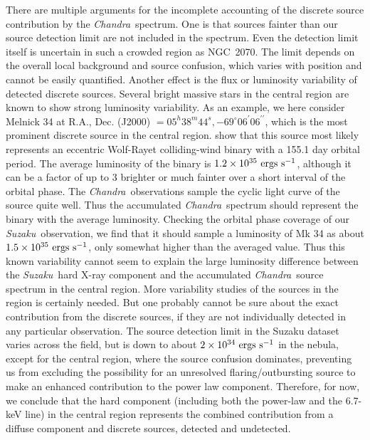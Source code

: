 \documentclass[usenatbib]{mnras}
\def\suzaku{{\sl Suzaku}}
\def\chandra{{\sl Chandra}}
\begin{document}
There are multiple arguments for the incomplete accounting of the discrete source contribution by the \chandra\ spectrum. One is that sources fainter than our source detection limit are not included in the spectrum. Even the detection limit itself is uncertain in such a crowded region as NGC~2070. The limit depends on the overall local background and source confusion, which varies with position and cannot be easily quantified. Another effect is the flux or luminosity variability of detected discrete sources. Several bright massive stars in the central region are known to show strong luminosity variability. As an example, we here consider Melnick 34 at R.A., Dec. (J2000) $= 05^h 38^m 44^s, -69^{\circ}06^{\prime}06^{\prime\prime}$, which is the most prominent discrete source in the central region. \citet{Pollock} show that this source most likely represents an eccentric Wolf-Rayet colliding-wind binary with a 155.1 day orbital period. The average luminosity of the binary is $1.2\times10^{35}~{\rm ergs~s^{-1}}$, although it can be a factor of up to 3 brighter or much fainter over a short interval of the orbital phase. The \chandra\ observations sample the cyclic light curve of the source quite well. Thus the accumulated \chandra\ spectrum should represent the binary with the average luminosity. Checking the orbital phase coverage of our \suzaku\ observation, we find that it should sample a luminosity of Mk 34 as about $1.5 \times10^{35}~{\rm ergs~s^{-1}}$, only somewhat higher than the averaged value. Thus this known variability cannot seem to explain the large luminosity difference between the \suzaku\ hard X-ray component and the accumulated \chandra\ source spectrum in the central region. More variability studies of the sources in the region is certainly needed.  But one probably cannot be sure about the exact contribution from the discrete sources, if they are not individually detected in any particular observation. The source detection limit in the Suzaku dataset varies across the field, but is down to about $2 \times 10^{34} {\rm~ergs~s^{-1}}$ in the nebula, except for the central region,  where the source confusion dominates, preventing us from excluding the possibility for an unresolved flaring/outbursting source to make an enhanced contribution to the power law component.  Therefore, for now, we conclude that the hard component (including both the power-law and the 6.7-keV line)  in the central region represents the combined contribution from a diffuse component and discrete sources, detected and undetected.
\end{document}
